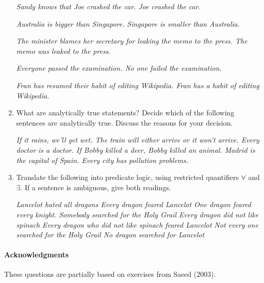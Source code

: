 \documentclass[a4paper]{article}
\newcommand{\ix}{\ex\it}
\begin{document}
\begin{enumerate}
\begin{exe}
\ex
  \begin{xlist}
 \ix Sandy knows that Joe crashed the car. 
 \ix Joe crashed the car. 
\end{xlist}
\ex 
  \begin{xlist}
    \ix Australia is bigger than Singapore. 
    \ix Singapore is smaller than Australia. 
  \end{xlist}
\ex 
  \begin{xlist}
\ix The minister blames her secretary for leaking the memo to the press. 
\ix The memo was leaked to the press. 
\end{xlist}
\ex 
  \begin{xlist}
\ix Everyone passed the examination. 
\ix No one failed the examination. 
\end{xlist}
\ex 
\begin{xlist}
  \ix Fran has resumed their habit of editing Wikipedia. 
  \ix Fran has a habit of editing Wikipedia. 
\end{xlist}
\end{exe}

\newpage
\item  What are analytically true statements? Decide which of the 
following sentences are analytically true. Discuss the reasons for your decision. 
\begin{exe}
  \ix If it rains, we'll get wet. 
  \ix The train will either arrive or it won't arrive. 
  \ix Every doctor is a doctor. 
  \ix If Bobby killed a deer, Bobby killed an animal. 
  \ix Madrid is the capital of Spain. 
  \ix Every city has pollution problems. 
\end{exe}

\item Translate the following into predicate logic, using restricted
  quantifiers $\forall$ and $\exists$.  If a sentence is ambiguous,
  give both readings.
  \begin{exe}
    \ix Lancelot hated all dragons
    \ix Every dragon feared Lancelot
    \ix One dragon feared every knight.
    \ix Somebody searched for the Holy Grail
    \ix Every dragon did not like spinach
    \ix Every dragon who did not like spinach feared Lancelot
    \ix Not every one searched for the Holy Grail
    \ix No dragon searched for Lancelot
  \end{exe}
\end{enumerate}

\vfill
\paragraph{Acknowledgments} These questions are partially
based on exercises from Saeed (2003).
\end{document}
